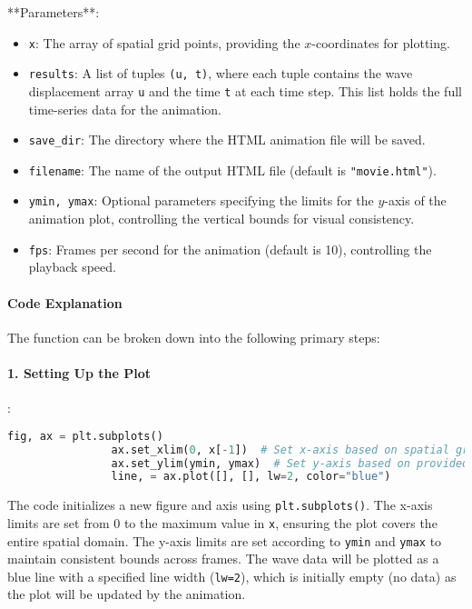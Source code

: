 \documentclass{article}
\begin{document}
			**Parameters**:
			\begin{itemize}
				\item \texttt{x}: The array of spatial grid points, providing the $x$-coordinates for plotting.
				\item \texttt{results}: A list of tuples \texttt{(u, t)}, where each tuple contains the wave displacement array \texttt{u} and the time \texttt{t} at each time step. This list holds the full time-series data for the animation.
				\item \texttt{save\_dir}: The directory where the HTML animation file will be saved.
				\item \texttt{filename}: The name of the output HTML file (default is \texttt{"movie.html"}).
				\item \texttt{ymin, ymax}: Optional parameters specifying the limits for the $y$-axis of the animation plot, controlling the vertical bounds for visual consistency.
				\item \texttt{fps}: Frames per second for the animation (default is 10), controlling the playback speed.
			\end{itemize}
			
			\paragraph{Code Explanation}
			
			The function can be broken down into the following primary steps:
			
			\paragraph{1. Setting Up the Plot}
			:
			\begin{lstlisting}[language=Python]
				fig, ax = plt.subplots()
				ax.set_xlim(0, x[-1])  # Set x-axis based on spatial grid
				ax.set_ylim(ymin, ymax)  # Set y-axis based on provided limits
				line, = ax.plot([], [], lw=2, color="blue")
			\end{lstlisting}
			The code initializes a new figure and axis using \texttt{plt.subplots()}. The x-axis limits are set from \(0\) to the maximum value in \texttt{x}, ensuring the plot covers the entire spatial domain. The y-axis limits are set according to \texttt{ymin} and \texttt{ymax} to maintain consistent bounds across frames. The wave data will be plotted as a blue line with a specified line width (\texttt{lw=2}), which is initially empty (no data) as the plot will be updated by the animation.
			
\end{document}
